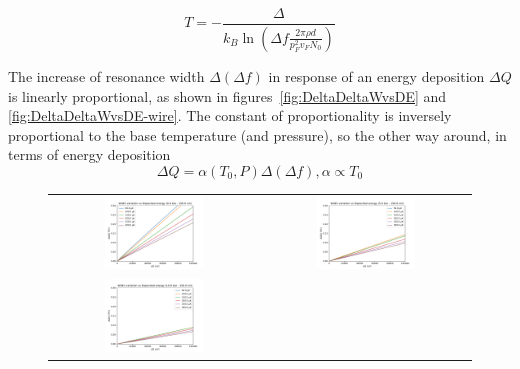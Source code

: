 \documentclass[a4paper,12pt]{article}
\begin{document}
\begin{equation}
T = - \frac{\varDelta}{k_B \ln \left( \Delta f \frac{2 \pi \rho d}{p_F^2 v_F N_0} \right)}
\end{equation}

The increase of resonance width $\Delta (\Delta f)$ in response of an energy deposition $\Delta Q$ is linearly proportional, as shown in figures~\ref{fig:DeltaDeltaWvsDE} and \ref{fig:DeltaDeltaWvsDE-wire}.
The constant of proportionality is inversely proportional to the base temperature (and pressure), so the other way around, in terms of energy deposition
\begin{equation}
  \Delta Q = \alpha(T_0,P) \Delta (\Delta f), \alpha \propto T_0
    \label{eq:alpha}
\end{equation}

\begin{figure}[!ht]
  \begin{center}
  \begin{tabular}{cc}
    \includegraphics[width=0.49\textwidth]{DeltaDeltaW_vs_DE-0bar}  &
    \includegraphics[width=0.49\textwidth]{DeltaDeltaW_vs_DE-5bar}  \\
    \includegraphics[width=0.49\textwidth]{DeltaDeltaW_vs_DE-10bar} &

\end{tabular}
\end{center}
\end{figure}
\end{document}

